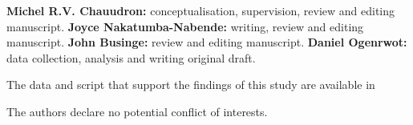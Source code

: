 \documentclass[AMA,Times1COL]{WileyNJDv5} %
\begin{document}
{}

\textbf{Michel R.V. Chauudron:} conceptualisation, supervision, review and editing manuscript. \textbf{Joyce Nakatumba-Nabende:} writing, review and editing manuscript.  \textbf{John Businge:} review and editing manuscript. \textbf{Daniel Ogenrwot:} data collection, analysis and writing original draft.

The data and script that support the findings of this study are available in 


The authors declare no potential conflict of interests.








\appendix
\end{document}
